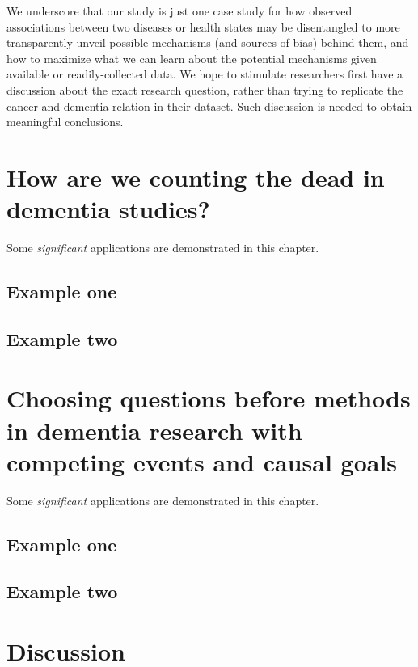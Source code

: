 \documentclass[
]{book}
\begin{document}
We underscore that our study is just one case study for how observed associations between two diseases or health states may be disentangled to more transparently unveil possible mechanisms (and sources of bias) behind them, and how to maximize what we can learn about the potential mechanisms given available or readily-collected data. We hope to stimulate researchers first have a discussion about the exact research question, rather than trying to replicate the cancer and dementia relation in their dataset. Such discussion is needed to obtain meaningful conclusions.

\hypertarget{chapter5}{%
\chapter{How are we counting the dead in dementia studies?}\label{chapter5}}

Some \emph{significant} applications are demonstrated in this chapter.

\hypertarget{example-one}{%
\section{Example one}\label{example-one}}

\hypertarget{example-two}{%
\section{Example two}\label{example-two}}

\hypertarget{chapter6}{%
\chapter{Choosing questions before methods in dementia research with competing events and causal goals}\label{chapter6}}

Some \emph{significant} applications are demonstrated in this chapter.

\hypertarget{example-one-1}{%
\section{Example one}\label{example-one-1}}

\hypertarget{example-two-1}{%
\section{Example two}\label{example-two-1}}

\hypertarget{chapter7}{%
\chapter{Discussion}\label{chapter7}}
\end{document}

